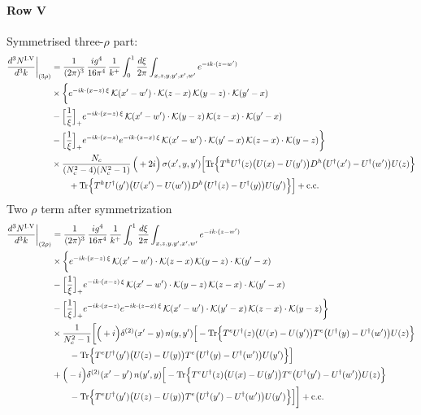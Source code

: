 \documentclass[9pt]{article}
\numberwithin{equation}{section}
\begin{document}
\paragraph*{Row V}
Symmetrised three-$\rho$ part:
\begin{align}
\frac{d^{3}N^{\rm I.V}}{d^{3}k}\bigg|_{(3\rho)}&=\frac{1}{(2\pi)^{3}}\,\frac{ig^{4}}{16\pi^{4}}\,\frac{1}{k^{+}}\int_{0}^{1}\frac{d\xi}{2\pi}\int_{x,z,y,y',x',w'}e^{-ik\cdot(z-w')}\notag\\
&\times\bigg\{e^{-ik\cdot(x-z)\,\xi}\,\mathcal{K}(x'-w')\cdot\mathcal{K}(z-x)\,\mathcal{K}(y-z)\cdot\mathcal{K}(y'-x)\notag\\
&-\Big[\frac{1}{\xi}\Big]_{+}e^{-ik\cdot(x-z)\,\xi}\,\mathcal{K}(x'-w')\cdot\mathcal{K}(y-z)\,\mathcal{K}(z-x)\cdot\mathcal{K}(y'-x)\notag\\
&-\Big[\frac{1}{\xi}\Big]_{+}e^{-ik\cdot(x-z)}e^{-ik\cdot(z-x)\,\xi}\,\mathcal{K}(x'-w')\cdot\mathcal{K}(y'-x)\,\mathcal{K}(z-x)\cdot\mathcal{K}(y-z)\bigg\}\notag\\
&\times \frac{N_{c}}{(N_{c}^{2}-4)(N_{c}^{2}-1)}\,\Big(+2i\Big)\,\sigma(x',y,y')\Big[{\rm Tr}\Big\{T^{h}U^{\dagger}(z)\big(U(x)-U(y')\big)D^{h}\big(U^{\dagger}(x')-U^{\dagger}(w')\big)U(z)\Big\}\notag\\&\qquad+{\rm Tr}\Big\{T^{h}U^{\dagger}(y')\big(U(x')-U(w')\big)D^{h}\big(U^{\dagger}(z)-U^{\dagger}(y)\big)U(y')\Big\}\Big]+{\rm c.c.}\label{eq:S-I.V-3}
\end{align}
Two $\rho$ term after symmetrization
\begin{align}
\frac{d^{3}N^{\rm I.V}}{d^{3}k}\bigg|_{(2\rho)} &=\frac{1}{(2\pi)^{3}}\,\frac{ig^{4}}{16\pi^{4}}\,\frac{1}{k^{+}}\int_{0}^{1}\frac{d\xi}{2\pi}\int_{x,z,y,y',x',w'}e^{-ik\cdot(z-w')}\notag\\
&\times\bigg\{e^{-ik\cdot(x-z)\,\xi}\,\mathcal{K}(x'-w')\cdot\mathcal{K}(z-x)\,\mathcal{K}(y-z)\cdot\mathcal{K}(y'-x)\notag\\
&-\Big[\frac{1}{\xi}\Big]_{+}e^{-ik\cdot(x-z)\,\xi}\,\mathcal{K}(x'-w')\cdot\mathcal{K}(y-z)\,\mathcal{K}(z-x)\cdot\mathcal{K}(y'-x)\notag\\
&-\Big[\frac{1}{\xi}\Big]_{+}e^{-ik\cdot(x-z)}e^{-ik\cdot(z-x)\,\xi}\,\mathcal{K}(x'-w')\cdot\mathcal{K}(y'-x)\,\mathcal{K}(z-x)\cdot\mathcal{K}(y-z)\bigg\}\notag\\
&\times \frac{1}{N_{c}^{2}-1}\bigg[\Big(+i\Big)\delta^{(2)}(x'-y)\,n(y,y')\Big[-{\rm Tr}\Big\{T^{e}U^{\dagger}(z)\big(U(x)-U(y')\big)T^{e}\big(U^{\dagger}(y)-U^{\dagger}(w')\big)U(z)\Big\}\notag\\&\qquad-{\rm Tr}\Big\{T^{e}U^{\dagger}(y')\big(U(z)-U(y)\big)T^{e}\big(U^{\dagger}(y)-U^{\dagger}(w')\big)U(y')\Big\}\Big]\notag\\
& +\Big(-i\Big)\delta^{(2)}(x'-y')\,n(y',y)\Big[-{\rm Tr}\Big\{T^{e}U^{\dagger}(z)\big(U(x)-U(y')\big)T^{e}\big(U^{\dagger}(y')-U^{\dagger}(w')\big)U(z)\Big\}\notag\\&\qquad-{\rm Tr}\Big\{T^{e}U^{\dagger}(y')\big(U(z)-U(y)\big)T^{e}\big(U^{\dagger}(y')-U^{\dagger}(w')\big)U(y')\Big\}\Big]\bigg]+{\rm c.c.}\label{eq:S-I.V-2}
\end{align}
\end{document}
